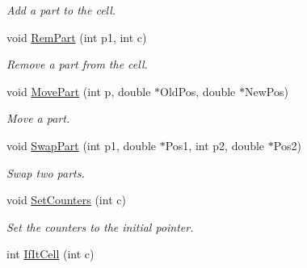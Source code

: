 \begin{DoxyCompactItemize}
\begin{DoxyCompactList}\small\item\em \-Add a part to the cell. \end{DoxyCompactList}\item 
\hypertarget{classDdFixedSize_ae9da2e58e698bf5bcdca4f880d5579ff}{void \hyperlink{classDdFixedSize_ae9da2e58e698bf5bcdca4f880d5579ff}{\-Rem\-Part} (int p1, int c)}\label{classDdFixedSize_ae9da2e58e698bf5bcdca4f880d5579ff}

\begin{DoxyCompactList}\small\item\em \-Remove a part from the cell. \end{DoxyCompactList}\item 
\hypertarget{classDdFixedSize_a02a69943ed15121906bda20d9c89cb37}{void \hyperlink{classDdFixedSize_a02a69943ed15121906bda20d9c89cb37}{\-Move\-Part} (int p, double $\ast$\-Old\-Pos, double $\ast$\-New\-Pos)}\label{classDdFixedSize_a02a69943ed15121906bda20d9c89cb37}

\begin{DoxyCompactList}\small\item\em \-Move a part. \end{DoxyCompactList}\item 
\hypertarget{classDdFixedSize_ae468af31d1a530ba0fdaef088c4b9c00}{void \hyperlink{classDdFixedSize_ae468af31d1a530ba0fdaef088c4b9c00}{\-Swap\-Part} (int p1, double $\ast$\-Pos1, int p2, double $\ast$\-Pos2)}\label{classDdFixedSize_ae468af31d1a530ba0fdaef088c4b9c00}

\begin{DoxyCompactList}\small\item\em \-Swap two parts. \end{DoxyCompactList}\item 
\hypertarget{classDdFixedSize_aadd6f477626e28e8284b9db4649e841d}{void \hyperlink{classDdFixedSize_aadd6f477626e28e8284b9db4649e841d}{\-Set\-Counters} (int c)}\label{classDdFixedSize_aadd6f477626e28e8284b9db4649e841d}

\begin{DoxyCompactList}\small\item\em \-Set the counters to the initial pointer. \end{DoxyCompactList}\item 
\hypertarget{classDdFixedSize_af49812231dd30b603631791b87eba9f9}{int \hyperlink{classDdFixedSize_af49812231dd30b603631791b87eba9f9}{\-If\-It\-Cell} (int c)}\label{classDdFixedSize_af49812231dd30b603631791b87eba9f9}


\end{DoxyCompactItemize}
